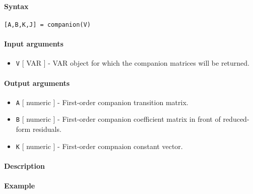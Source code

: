 


	\paragraph{Syntax}

\begin{verbatim}
[A,B,K,J] = companion(V)
\end{verbatim}

\paragraph{Input arguments}

\begin{itemize}
\itemsep1pt\parskip0pt
\item
  \texttt{V} {[} VAR {]} - VAR object for which the companion matrices
  will be returned.
\end{itemize}

\paragraph{Output arguments}

\begin{itemize}
\item
  \texttt{A} {[} numeric {]} - First-order companion transition matrix.
\item
  \texttt{B} {[} numeric {]} - First-order companion coefficient matrix
  in front of reduced-form residuals.
\item
  \texttt{K} {[} numeric {]} - First-order compnaion constant vector.
\end{itemize}

\paragraph{Description}

\paragraph{Example}


